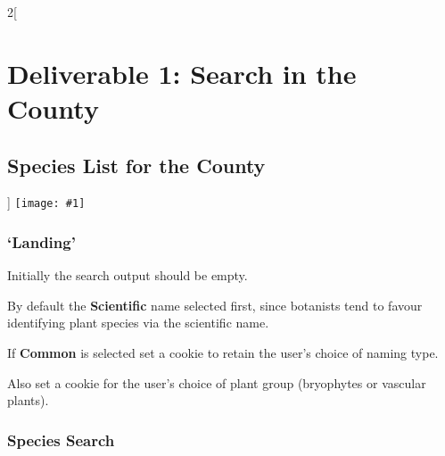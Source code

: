 \documentclass[a4paper,12pt,landscape]{article}
\newcommand{\wireframe}[1]{\texttt{[image: \#1]}\clearpage}
\begin{document}
\begin{multicols*}{2}[%
  \section{Deliverable 1: Search in the County}%
  \subsection{Species List for the County}%
  \label{sec:species-list-for-county}%
]
\thispagestyle{empty}
\wireframe{./wireframes/Species__ListForCounty.png}%

\subsubsection*{`Landing'} 

\begin{todolist}
  \item Initially the search output should be empty.
  \item By default the \textbf{Scientific} name selected first,
  since botanists tend to favour identifying
  plant species via the scientific name.
  \item If \textbf{Common} is selected set a cookie to retain the user's choice of naming type.
  \item Also set a cookie for the user's choice of plant group (bryophytes or vascular plants).
\end{todolist}

\subsubsection*{Species Search}


\end{multicols*}
\end{document}
